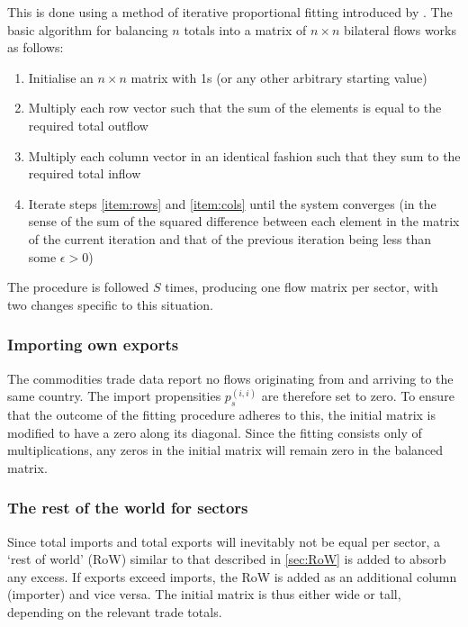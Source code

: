 \documentclass{article}
\begin{document}
This is done using a method of iterative proportional fitting introduced by \textcite{deming_least_1940}.
The basic algorithm for balancing $n$ totals into a matrix of $n \times n$ bilateral flows works as follows:
\begin{enumerate}
\itemsep -0.2em 
\item Initialise an $n \times n$ matrix with 1s (or any other arbitrary starting value)
\item Multiply each row vector such that the sum of the elements is equal to the required total outflow \label{item:rows}
\item Multiply each column vector in an identical fashion such that they sum to the required total inflow \label{item:cols}
\item Iterate steps \ref{item:rows} and \ref{item:cols} until the system converges (in the sense of the sum of the squared difference between each element in the matrix of the current iteration and that of the previous iteration being less than some $\epsilon > 0$)
\end{enumerate}
The procedure is followed $S$ times, producing one flow matrix per sector, with two changes specific to this situation.
\subsubsection{Importing own exports}
The commodities trade data report no flows originating from and arriving to the same country.
The import propensities $p_s^{(i,i)}$ are therefore set to zero.
To ensure that the outcome of the fitting procedure adheres to this, the initial matrix is modified to have a zero along its diagonal.
Since the fitting consists only of multiplications, any zeros in the initial matrix will remain zero in the balanced matrix.

\subsubsection{The rest of the world for sectors}
Since total imports and total exports will inevitably not be equal per sector, a `rest of world' (RoW) similar to that described in \cref{sec:RoW} is added to absorb any excess.
If exports exceed imports, the RoW is added as an additional column (importer) and vice versa.
The initial matrix is thus either wide or tall, depending on the relevant trade totals.
\end{document}

